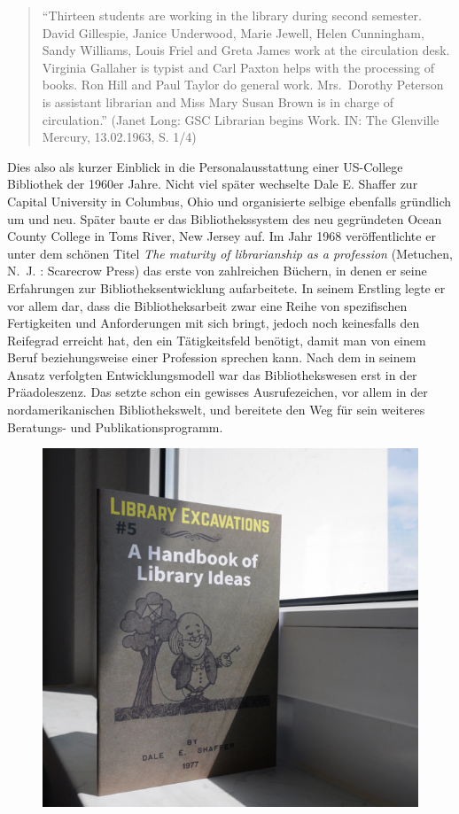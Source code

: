 \documentclass[a4paper,
fontsize=11pt,
oneside,
numbers=noperiodatend,
parskip=half-,
bibliography=totoc,
final
]{scrartcl}
\begin{document}
\begin{quote}
\enquote{Thirteen students are working in the library during second
semester. David Gillespie, Janice Underwood, Marie Jewell, Helen
Cunningham, Sandy Williams, Louis Friel and Greta James work at the
circulation desk. Virginia Gallaher is typist and Carl Paxton helps with
the processing of books. Ron Hill and Paul Taylor do general work.
Mrs.~Dorothy Peterson is assistant librarian and Miss Mary Susan Brown
is in charge of circulation.} (Janet Long: GSC Librarian begins Work.
IN: The Glenville Mercury, 13.02.1963, S. 1/4)
\end{quote}

Dies also als kurzer Einblick in die Personalausstattung einer
US-College Bibliothek der 1960er Jahre. Nicht viel später wechselte Dale
E. Shaffer zur Capital University in Columbus, Ohio und organisierte
selbige ebenfalls gründlich um und neu. Später baute er das
Bibliothekssystem des neu gegründeten Ocean County College in Toms
River, New Jersey auf. Im Jahr 1968 veröffentlichte er unter dem schönen
Titel \emph{The maturity of librarianship as a profession} (Metuchen,
N.~J. : Scarecrow Press) das erste von zahlreichen Büchern, in denen er
seine Erfahrungen zur Bibliotheksentwicklung aufarbeitete. In seinem
Erstling legte er vor allem dar, dass die Bibliotheksarbeit zwar eine
Reihe von spezifischen Fertigkeiten und Anforderungen mit sich bringt,
jedoch noch keinesfalls den Reifegrad erreicht hat, den ein
Tätigkeitsfeld benötigt, damit man von einem Beruf beziehungsweise einer
Profession sprechen kann. Nach dem in seinem Ansatz verfolgten
Entwicklungsmodell war das Bibliothekswesen erst in der Präadoleszenz.
Das setzte schon ein gewisses Ausrufezeichen, vor allem in der
nordamerikanischen Bibliothekswelt, und bereitete den Weg für sein
weiteres Beratungs- und Publikationsprogramm.

\begin{figure}
\centering
\includegraphics{lib_excavations.png}
\caption{}
\end{figure}
\end{document}
